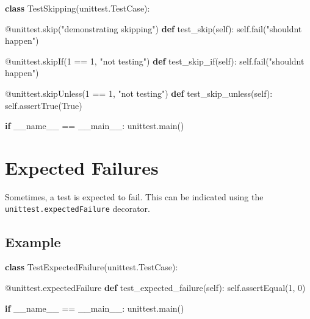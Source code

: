 \documentclass[
  letterpaper,
  DIV=11,
  numbers=noendperiod]{scrreprt}
\newenvironment{Shaded}{\begin{snugshade}}{\end{snugshade}}
\newcommand{\AttributeTok}[1]{\textcolor[rgb]{0.40,0.45,0.13}{#1}}
\newcommand{\ControlFlowTok}[1]{\textcolor[rgb]{0.00,0.23,0.31}{\textbf{#1}}}
\newcommand{\DecValTok}[1]{\textcolor[rgb]{0.68,0.00,0.00}{#1}}
\newcommand{\KeywordTok}[1]{\textcolor[rgb]{0.00,0.23,0.31}{\textbf{#1}}}
\newcommand{\NormalTok}[1]{\textcolor[rgb]{0.00,0.23,0.31}{#1}}
\newcommand{\OperatorTok}[1]{\textcolor[rgb]{0.37,0.37,0.37}{#1}}
\newcommand{\StringTok}[1]{\textcolor[rgb]{0.13,0.47,0.30}{#1}}
\newcommand{\VariableTok}[1]{\textcolor[rgb]{0.07,0.07,0.07}{#1}}
\begin{document}
\begin{Shaded}
\begin{Highlighting}[]
\KeywordTok{class}\NormalTok{ TestSkipping(unittest.TestCase):}

    \AttributeTok{@unittest.skip}\NormalTok{(}\StringTok{"demonstrating skipping"}\NormalTok{)}
    \KeywordTok{def}\NormalTok{ test\_skip(}\VariableTok{self}\NormalTok{):}
        \VariableTok{self}\NormalTok{.fail(}\StringTok{"shouldn\textquotesingle{}t happen"}\NormalTok{)}

    \AttributeTok{@unittest.skipIf}\NormalTok{(}\DecValTok{1} \OperatorTok{==} \DecValTok{1}\NormalTok{, }\StringTok{"not testing"}\NormalTok{)}
    \KeywordTok{def}\NormalTok{ test\_skip\_if(}\VariableTok{self}\NormalTok{):}
        \VariableTok{self}\NormalTok{.fail(}\StringTok{"shouldn\textquotesingle{}t happen"}\NormalTok{)}

    \AttributeTok{@unittest.skipUnless}\NormalTok{(}\DecValTok{1} \OperatorTok{==} \DecValTok{1}\NormalTok{, }\StringTok{"not testing"}\NormalTok{)}
    \KeywordTok{def}\NormalTok{ test\_skip\_unless(}\VariableTok{self}\NormalTok{):}
        \VariableTok{self}\NormalTok{.assertTrue(}\VariableTok{True}\NormalTok{)}

\ControlFlowTok{if} \VariableTok{\_\_name\_\_} \OperatorTok{==} \StringTok{\textquotesingle{}\_\_main\_\_\textquotesingle{}}\NormalTok{:}
\NormalTok{    unittest.main()}
\end{Highlighting}
\end{Shaded}

\section{Expected Failures}\label{expected-failures}

Sometimes, a test is expected to fail. This can be indicated using the
\texttt{unittest.expectedFailure} decorator.

\subsection{Example}\label{example-15}

\begin{Shaded}
\begin{Highlighting}[]
\KeywordTok{class}\NormalTok{ TestExpectedFailure(unittest.TestCase):}

    \AttributeTok{@unittest.expectedFailure}
    \KeywordTok{def}\NormalTok{ test\_expected\_failure(}\VariableTok{self}\NormalTok{):}
        \VariableTok{self}\NormalTok{.assertEqual(}\DecValTok{1}\NormalTok{, }\DecValTok{0}\NormalTok{)}

\ControlFlowTok{if} \VariableTok{\_\_name\_\_} \OperatorTok{==} \StringTok{\textquotesingle{}\_\_main\_\_\textquotesingle{}}\NormalTok{:}
\NormalTok{    unittest.main()}
\end{Highlighting}
\end{Shaded}
\end{document}
